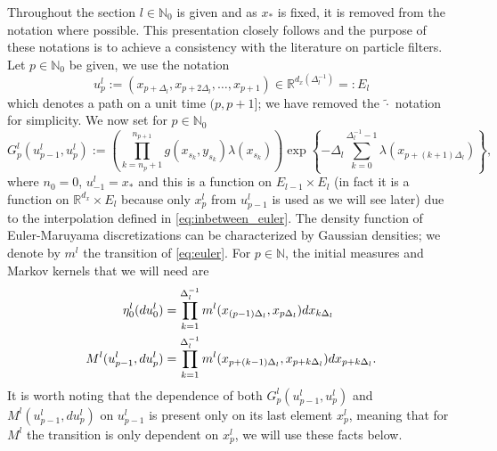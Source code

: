 \documentclass[english]{article}
\begin{document}
Throughout the section $l\in\mathbb{N}_0$ is given and as $x_{*}$ is fixed, it is removed from the notation where possible. This presentation closely follows \cite{jasra} and the purpose of these notations is to achieve a consistency with the literature on particle filters. Let $p\in\mathbb{N}_0$ be given, we use the notation
$$
u_p^l := (x_{p+\Delta_l},x_{p+2\Delta_l},\dots, x_{p+1}) \in\mathbb{R}^{d_x(\Delta_l^{-1})} =: E_l
$$
which denotes a path on a unit time $(p,p+1]$; we have removed the $\widetilde{\cdot}$ notation for simplicity. %
We now set for $p\in\mathbb{N}_0$
$$
G_p^l(u_{p-1}^l,u_p^l) := \left(\prod_{k=n_{p}+1}^{n_{p+1}}g(x_{s_k},y_{s_k})\lambda(x_{s_k})\right)\exp\left\{-\Delta_l\sum_{k=0}^{\Delta_l^{-1}-1}\lambda(x_{p+(k+1)\Delta_l})\right\},
$$
where $n_0=0$, $u_{-1}^l=x_{*}$ and this is a function on $E_{l-1} \times E_l$ (in fact it is a function on $\mathbb{R}^{d_x}\times E_l$ because only $x_p^l$ from $u_{p-1}^l$ is used as we will see later) due to the interpolation defined in \eqref{eq:inbetween_euler}. 
The density function of Euler-Maruyama discretizations can be characterized by Gaussian densities; we denote by $m^{l}$ the transition of \eqref{eq:euler}. For $p \in \mathbb{N}$, the initial measures and Markov kernels that we will need are
\begin{align*}
\eta_{0}^l(du_{0}^l) & =  \prod_{k=1}^{\Delta_l^{-1}} m^l(x_{(p-1)\Delta_l},x_{p\Delta_l})dx_{k\Delta_l} \\
\vspace{-5pt}
M^{l}(u_{p-1}^l,du_{p}^l) & = \prod_{k=1}^{\Delta_l^{-1}} m^l(x_{p+(k-1)\Delta_l},x_{p+k\Delta_l})dx_{p+k\Delta_l}.
\end{align*}
It is worth noting that the dependence of both $G_{p}^{l}(u_{p-1}^l,u_{p}^l)$ and $M^{l}(u_{p-1}^l,du_{p}^l)$ on $u_{p-1}^l$ is present only on its last element $x_p^l$, meaning that for $M^l$ the transition is only dependent on $x_p^l$, we will use these facts below. 
\end{document}
